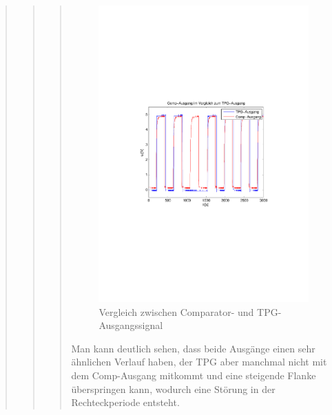\begin{quote}
\begin{quote}
\begin{quote}
            
             \begin{figure}[H] \centering
                    \includegraphics[scale=0.5, trim = 2cm 6.5cm 1.5cm 8.5cm,
                    clip]{./Bilder/comp_vs_tpg}
                        \caption{Vergleich zwischen Comparator- und
                        TPG-Ausgangssignal}
                \end{figure}
          
          Man kann deutlich sehen, dass beide Ausgänge einen sehr ähnlichen
          Verlauf haben, der TPG aber manchmal nicht mit dem Comp-Ausgang
          mitkommt und eine steigende Flanke überspringen kann, wodurch eine
          Störung in der Rechteckperiode entsteht.\\
          
          \vspace{0.5em}
          

\end{quote}
\end{quote}
\end{quote}
